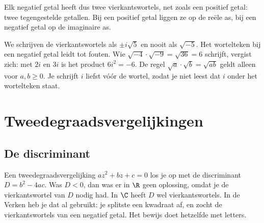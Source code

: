 Elk negatief getal heeft dus twee vierkantswortels, net zoals een positief getal: twee tegengestelde getallen. Bij een positief getal liggen ze op de reële as, bij een negatief getal op de imaginaire as.

We schrijven de vierkantswortels als $\pm i\sqrt{5}$ en nooit als $\sqrt{-5}$. Het wortelteken bij een negatief getal leidt tot fouten. Wie $\sqrt{-4} \cdot \sqrt{-9} = \sqrt{36} = 6$ schrijft, vergist zich: met $2i$ en $3i$ is het product $6i^2 = -6$. De regel $\sqrt{a} \cdot \sqrt{b} = \sqrt{ab}$ geldt alleen voor $a, b \geqslant 0$. Je schrijft $i$ liefst vóór de wortel, zodat je niet leest dat $i$ onder het wortelteken staat.


\begin{oefeningen}
\end{oefeningen}

\section{Tweedegraadsvergelijkingen}

\subsection{De discriminant}

Een tweedegraadsvergelijking $az^2 + bz + c = 0$ los je op met de discriminant $D = b^2 - 4ac$. Was $D < 0$, dan was er in $\R$ geen oplossing, omdat je de vierkantswortel van $D$ nodig had. In $\C$ heeft $D$ wel vierkantswortels. In de Verken heb je dat al gebruikt: je splitste een kwadraat af, en zocht de vierkantswortels van een negatief getal. Het bewijs doet hetzelfde met letters.

